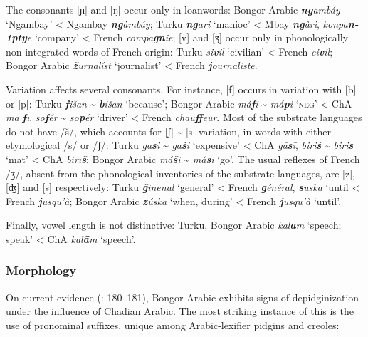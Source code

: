 \documentclass[output=paper]{langsci/langscibook}
\begin{document}
  The consonants [ɲ] and [ŋ] occur only in loanwords: Bongor Arabic \textit{\textbf{ng}ambáy} ‘Ngambay’ < Ngambay \textit{\textbf{ng}àmbáy}; Turku \textit{\textbf{ng}ari} ‘manioc’ < Mbay \textit{\textbf{ng}àrì}, \textit{konpa}\textit{\textbf{n\kern -1pty}e} ‘company’ < French \textit{compa}\textit{\textbf{gn}ie}; [v] and [ʒ] occur only in phonologically non-integrated words of French origin: Turku \textit{si}\textit{\textbf{v}il} ‘civilian’ < French \textit{ci}\textit{\textbf{v}il}; Bongor Arabic \textit{\textbf{ž}urnalíst} `journalist' < French \textit{\textbf{j}ournaliste}. 

   Variation affects several consonants. For instance, [f] occurs in variation with [b] or [p]: Turku \textit{\textbf{f}išan} {\textasciitilde} \textit{\textbf{b}išan} ‘because’; Bongor Arabic \textit{má}\textit{\textbf{f}i} {\textasciitilde} \textit{má}\textit{\textbf{p}i} ‘\textsc{neg}’ < ChA \textit{mā} \textit{\textbf{f}ī}, \textit{so}\textit{\textbf{f}ér} {\textasciitilde} \textit{so}\textit{\textbf{p}ér} ‘driver’ < French \textit{chau}\textit{\textbf{ff}eur}. Most of the substrate languages do not have /š/, which accounts for [ʃ] {\textasciitilde} [s] variation, in words with either etymological /s/ or /ʃ/: Turku \textit{ga\textbf{s}i} {\textasciitilde} \textit{ga\textbf{š}i} ‘expensive’ < ChA \textit{gā\textbf{s}ī}, \textit{biri\textbf{š}} {\textasciitilde} \textit{biri\textbf{s}} ‘mat’ < ChA \textit{birī\textbf{š}}; Bongor Arabic \textit{má\textbf{š}i} {\textasciitilde} \textit{má\textbf{s}i} ‘go’. The usual reflexes of French /ʒ/, absent from the phonological inventories of the substrate languages, are [z], [ʤ] and [s] respectively: Turku \textit{\textbf{ǧ}inenal} ‘general’ < French \textit{\textbf{g}énéral}, \textit{\textbf{s}uska} ‘until < French \textit{\textbf{j}usqu’à}; Bongor Arabic \textit{\textbf{z}úska} `when, during' < French \textit{\textbf{j}usqu’à} `until'.

Finally, vowel length is not distinctive: Turku, Bongor Arabic \textit{kal\textbf{a}m} ‘speech; speak’ < ChA \textit{kal\textbf{ā}m} ‘speech’.


 \subsubsection{Morphology}

On current evidence (\citealt{Luffin2013}: 180–181), Bongor Arabic exhibits signs of depidginization under the influence of Chadian Arabic. The most striking instance of this is the use of pronominal suffixes, unique among Arabic-lexifier pidgins and creoles:
\end{document}
